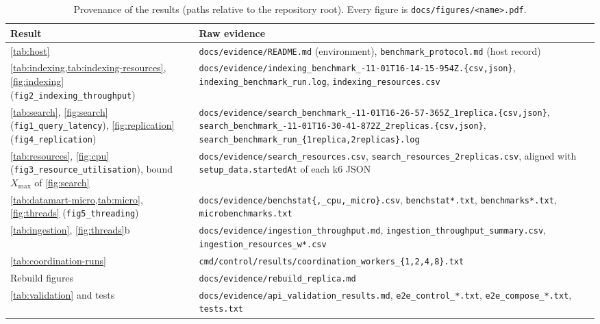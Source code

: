 \documentclass[10pt,a4paper]{article}
\newcommand{\code}[1]{\texttt{#1}}
\begin{document}
\begin{table}[htbp]
  \centering
  \footnotesize
  \caption{Provenance of the results (paths relative to the repository root).
  Every figure is \code{docs/figures/\allowbreak <name>.pdf}.}
  \label{tab:provenance}
  \begin{tabularx}{\textwidth}{@{}>{\raggedright\arraybackslash}p{4.1cm}>{\raggedright\arraybackslash}X@{}}
    \toprule
    Result & Raw evidence \\
    \midrule
    \cref{tab:host} & \code{docs/evidence/\allowbreak README.md} (environment),
      \code{benchmark\_protocol.md} (host record) \\
    \cref{tab:indexing,tab:indexing-resources}, \cref{fig:indexing}
      (\code{fig2\_\allowbreak indexing\_\allowbreak throughput}) &
      \code{docs/evidence/\allowbreak indexing\_benchmark\_\allowbreak 2026-11-01T16-14-15-954Z.\{csv,json\}},
      \code{indexing\_benchmark\_run.log}, \code{indexing\_resources.csv} \\
    \cref{tab:search}, \cref{fig:search} (\code{fig1\_\allowbreak query\_\allowbreak latency}),
      \cref{fig:replication} (\code{fig4\_replication}) &
      \code{docs/evidence/\allowbreak search\_benchmark\_\allowbreak 2026-11-01T16-26-57-365Z\_\allowbreak 1replica.\{csv,json\}},
      \code{search\_benchmark\_\allowbreak 2026-11-01T16-30-41-872Z\_\allowbreak 2replicas.\{csv,json\}},
      \code{search\_benchmark\_run\_\{1replica,2replicas\}.log} \\
    \cref{tab:resources}, \cref{fig:cpu} (\code{fig3\_\allowbreak resource\_\allowbreak utilisation}),
      bound $X_{\max}$ of \cref{fig:search} &
      \code{docs/evidence/\allowbreak search\_resources.csv},
      \code{search\_resources\_2replicas.csv}, aligned with
      \code{setup\_data.startedAt} of each k6 JSON \\
    \cref{tab:datamart-micro,tab:micro}, \cref{fig:threads}
      (\code{fig5\_threading}) &
      \code{docs/evidence/\allowbreak benchstat\{,\_cpu,\_micro\}.csv}, \code{benchstat*.txt},
      \code{benchmarks*.txt}, \code{microbenchmarks.txt} \\
    \cref{tab:ingestion}, \cref{fig:threads}b &
      \code{docs/evidence/\allowbreak ingestion\_throughput.md},
      \code{ingestion\_throughput\_summary.csv}, \code{ingestion\_resources\_w*.csv} \\
    \cref{tab:coordination-runs} & \code{cmd/control/results/coordination\_workers\_\{1,2,4,8\}.txt} \\
    Rebuild figures & \code{docs/evidence/\allowbreak rebuild\_replica.md} \\
    \cref{tab:validation} and tests & \code{docs/evidence/\allowbreak api\_validation\_results.md},
      \code{e2e\_control\_*.txt}, \code{e2e\_compose\_*.txt}, \code{tests.txt} \\
    \bottomrule
  \end{tabularx}
\end{table}
\end{document}
